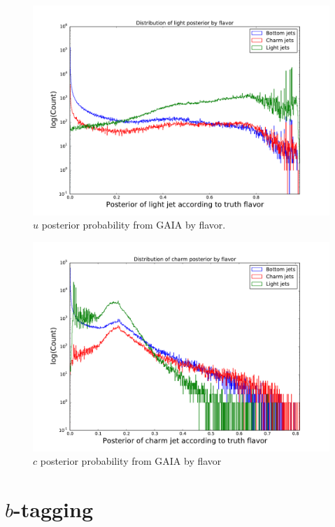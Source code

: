 \begin{figure}[h]
\includegraphics[width=\textwidth]{figures/light_p_distro}
\caption[The ATLAS detector]{$u$ posterior probability from GAIA by flavor.
\label{fig:upost}}
\end{figure}

\begin{figure}[h]
\includegraphics[width=\textwidth]{figures/charm_p_distro}
\caption[The ATLAS detector]{$c$ posterior probability from GAIA by flavor
\label{fig:cpost}}
\end{figure}



\section{$b$-tagging} 
\label{sec:btag}

